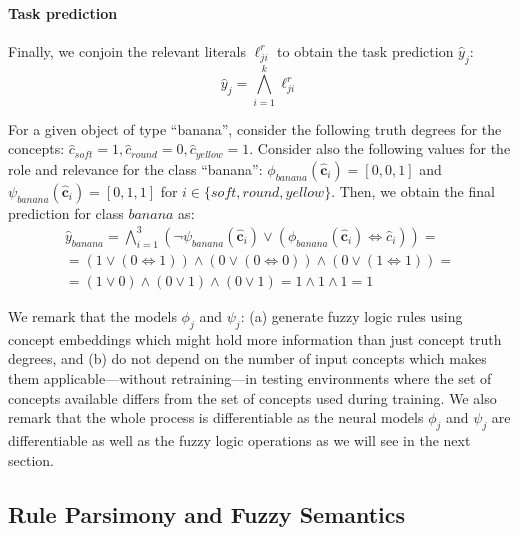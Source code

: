 \paragraph{Task prediction}
Finally, we conjoin the relevant literals $\ell^r_{ji}$ to obtain the task prediction $\hat{y}_j$:
\begin{equation}
\label{eq:ruletarget}
    \hat{y}_j = \bigwedge_{i=1}^k \ell^r_{ji} 
\end{equation}
\begin{example}
    For a given object of type ``banana'', consider the following truth degrees for the concepts:  $\hat{c}_{soft}= 1, \hat{c}_{round} = 0,\hat{c}_{yellow} = 1$. Consider also the following values for the role and relevance for the class ``banana'': $\phi_{\textit{banana}}(\hat{\mathbf{c}}_{i})=[0,0,1]$ and $\psi_{\textit{banana}}(\hat{\mathbf{c}}_{i})=[0,1,1]$ for $i \in \{\textit{soft}, \textit{round}, \textit{yellow}\}$. Then, we obtain the final prediction for class $banana$ as: 
    \[
    \begin{array}{r}
    \hat{y}_{\textit{banana}} = \bigwedge_{i=1}^3\left(\neg \psi_{\textit{banana}}(\hat{\mathbf{c}}_i) \vee (\phi_{\textit{banana}}(\hat{\mathbf{c}}_i) \Leftrightarrow \hat{c}_{i})\right) =    \\
    =(1\vee(0\Leftrightarrow 1))\wedge (0\vee(0\Leftrightarrow 0))\wedge (0\vee(1\Leftrightarrow 1))=
    \\
    =(1\vee 0)\wedge (0\vee 1)\wedge (0\vee 1)=1 \wedge 1 \wedge 1 = 1
    \end{array}
    \]
\end{example}
We remark that the models $\phi_j$ and $\psi_j$: (a) generate fuzzy logic rules using concept embeddings which might hold more information than just concept truth degrees, and (b) do not depend on the number of input concepts which makes them applicable---without retraining---in testing environments where the set of concepts available differs from the set of concepts used during training.
We also remark that the whole process is differentiable as the neural models $\phi_j$ and $\psi_j$ are differentiable as well as the fuzzy logic operations as we will see in the next section.

\subsection{Rule Parsimony and Fuzzy Semantics}
